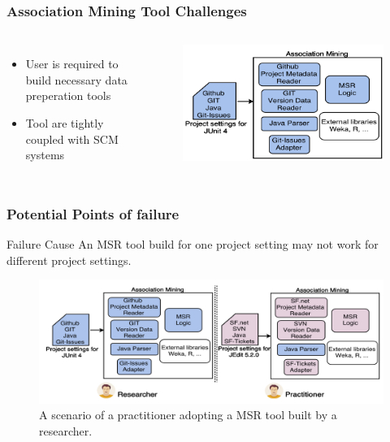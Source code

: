         \begin{frame}
            \frametitle{Association Mining Tool Challenges}
            \begin{columns}
                \begin{itemize}
                    \item User is required to build necessary data preperation tools
                    \item Tool are tightly coupled with SCM systems
                 \end{itemize}
                 \begin{figure}
                    \centering
                        \includegraphics[width=0.85\linewidth]{figures/association.png}
                 \end{figure}
             \end{columns}
        \end{frame}


        \begin{frame}
            \frametitle{Potential Points of failure}
            \begin{alertblock}{Failure Cause}
                An MSR tool build for one project setting may not work for different project settings.
            \end{alertblock}
             \begin{figure}
                \centering
                    \includegraphics[width=0.85\linewidth]{figures/adoptingreserch.png}
                        \caption{A scenario of a practitioner adopting a MSR tool built by a researcher.}
             \end{figure}
        \end{frame}

